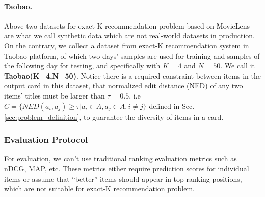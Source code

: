 
\paragraph{\textbf{Taobao.}}
Above two datasets for exact-K recommendation problem based on MovieLens are what we call synthetic data which are not real-world datasets in production.
On the contrary, we collect a dataset from exact-K recommendation system in Taobao platform,
of which two days' samples are used for training and samples of the following day for testing,
and specifically with $K=4$ and $N=50$.
We call it \textbf{Taobao(K=4,N=50)}.
Notice there is a required constraint between items in the output card in this dataset,
that normalized edit distance (NED) \cite{marzal1993computation} of any two items' titles must be larger than $\tau=0.5$, i.e $C=\{NED(a_i,a_j)\geq\tau|a_i\in A,a_j\in A,i\neq j\}$ defined in Sec. \ref{sec:problem_definition},
to guarantee the diversity of items in a card.

\subsubsection{Evaluation Protocol}
For evaluation, we can't use traditional ranking evaluation metrics such as nDCG, MAP, etc. 
These metrics either require prediction scores for individual items or assume that ``better'' items should appear in top ranking positions,
which are not suitable for exact-K recommendation problem.
